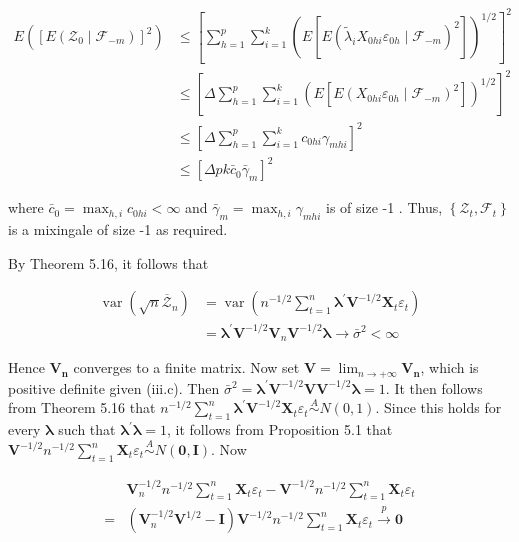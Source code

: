 \documentclass[10pt]{article}
\begin{document}
$$
\begin{aligned}
E\left(\left[E\left(\mathcal{Z}_{0} \mid \mathcal{F}_{-m}\right)\right]^{2}\right) & \leq\left[\sum_{h=1}^{p} \sum_{i=1}^{k}\left(E\left[E\left(\tilde{\lambda}_{i} X_{0 h i} \varepsilon_{0 h} \mid \mathcal{F}_{-m}\right)^{2}\right]\right)^{1 / 2}\right]^{2} \\
& \leq\left[\Delta \sum_{h=1}^{p} \sum_{i=1}^{k}\left(E\left[E\left(X_{0 h i} \varepsilon_{0 h} \mid \mathcal{F}_{-m}\right)^{2}\right]\right)^{1 / 2}\right]^{2} \\
& \leq\left[\Delta \sum_{h=1}^{p} \sum_{i=1}^{k} c_{0 h i} \gamma_{m h i}\right]^{2} \\
& \leq\left[\Delta p k \bar{c}_{0} \bar{\gamma}_{m}\right]^{2}
\end{aligned}
$$

where $\bar{c}_{0}=\max _{h, i} c_{0 h i}<\infty$ and $\bar{\gamma}_{m}=\max _{h, i} \gamma_{m h i}$ is of size -1 . Thus, $\left\{\mathcal{Z}_{t}, \mathcal{F}_{t}\right\}$ is a mixingale of size -1 as required.

By Theorem 5.16, it follows that

$$
\begin{aligned}
\operatorname{var}\left(\sqrt{n} \overline{\mathcal{Z}}_{n}\right) & =\operatorname{var}\left(n^{-1 / 2} \sum_{t=1}^{n} \boldsymbol{\lambda}^{\prime} \mathbf{V}^{-1 / 2} \mathbf{X}_{t} \varepsilon_{t}\right) \\
& =\boldsymbol{\lambda}^{\prime} \mathbf{V}^{-1 / 2} \mathbf{V}_{n} \mathbf{V}^{-1 / 2} \boldsymbol{\lambda} \rightarrow \bar{\sigma}^{2}<\infty
\end{aligned}
$$

Hence $\mathbf{V}_{\boldsymbol{n}}$ converges to a finite matrix. Now set $\mathbf{V}=\lim _{n \rightarrow+\infty} \mathbf{V}_{\boldsymbol{n}}$, which is positive definite given (iii.c). Then $\bar{\sigma}^{2}=\boldsymbol{\lambda}^{\prime} \mathbf{V}^{-1 / 2} \mathbf{V} \mathbf{V}^{-1 / 2} \boldsymbol{\lambda}=1$. It then follows from Theorem 5.16 that $n^{-1 / 2} \sum_{t=1}^{n} \boldsymbol{\lambda}^{\prime} \mathbf{V}^{-1 / 2} \mathbf{X}_{t} \varepsilon_{t} \stackrel{A}{\sim} N(0,1)$. Since this holds for every $\boldsymbol{\lambda}$ such that $\boldsymbol{\lambda}^{\prime} \boldsymbol{\lambda}=1$, it follows from Proposition 5.1 that $\mathbf{V}^{-1 / 2} n^{-1 / 2} \sum_{t=1}^{n} \mathbf{X}_{t} \varepsilon_{t} \stackrel{A}{\sim} N(\mathbf{0}, \mathbf{I})$. Now

$$
\begin{aligned}
& \mathbf{V}_{n}^{-1 / 2} n^{-1 / 2} \sum_{t=1}^{n} \mathbf{X}_{t} \varepsilon_{t}-\mathbf{V}^{-1 / 2} n^{-1 / 2} \sum_{t=1}^{n} \mathbf{X}_{t} \varepsilon_{t} \\
= & \left(\mathbf{V}_{n}^{-1 / 2} \mathbf{V}^{1 / 2}-\mathbf{I}\right) \mathbf{V}^{-1 / 2} n^{-1 / 2} \sum_{t=1}^{n} \mathbf{X}_{t} \varepsilon_{t} \xrightarrow{p} \mathbf{0}
\end{aligned}
$$
\end{document}
